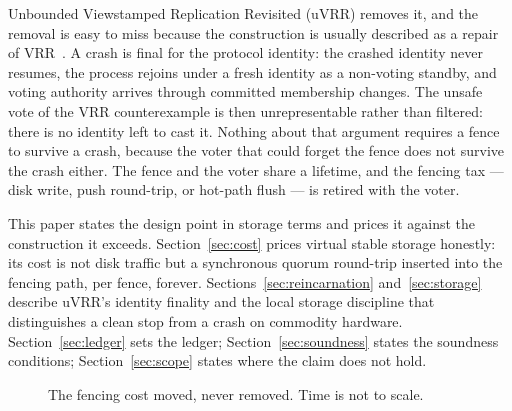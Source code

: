 \documentclass[10pt,journal,letterpaper]{IEEEtran}
\begin{document}
Unbounded Viewstamped Replication Revisited (uVRR) removes it, and the
removal is easy to miss because the construction is usually described as a
repair of VRR~\cite{uvrr}.
A crash is final for the protocol identity: the crashed identity never
resumes, the process rejoins under a fresh identity as a non-voting standby,
and voting authority arrives through committed membership changes.
The unsafe vote of the VRR counterexample is then unrepresentable rather than
filtered: there is no identity left to cast it.
Nothing about that argument requires a fence to survive a crash, because the
voter that could forget the fence does not survive the crash either.
The fence and the voter share a lifetime, and the fencing tax --- disk write,
push round-trip, or hot-path flush --- is retired with the voter.

This paper states the design point in storage terms and prices it against the
construction it exceeds.
Section~\ref{sec:cost} prices virtual stable storage honestly: its cost is
not disk traffic but a synchronous quorum round-trip inserted into the
fencing path, per fence, forever.
Sections~\ref{sec:reincarnation} and~\ref{sec:storage} describe uVRR's
identity finality and the local storage discipline that distinguishes a clean
stop from a crash on commodity hardware.
Section~\ref{sec:ledger} sets the ledger; Section~\ref{sec:soundness} states
the soundness conditions; Section~\ref{sec:scope} states where the claim does
not hold.

\begin{figure}[t]
\centering
{}
\caption{The fencing cost moved, never removed. Time is not to scale.}
\label{fig:arc}
\end{figure}
\end{document}
